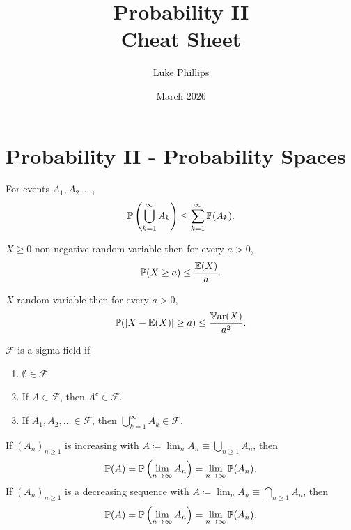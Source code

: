\documentclass[10pt, a4paper]{article}
\title{Probability II \\
    \large Cheat Sheet}
\author{Luke Phillips}
\date{March 2026}
\begin{document}
\maketitle

\newpage

\section{Probability II -
    Probability Spaces}

\begin{proposition}
    For events $A_1, A_2, \dotsc$,
    \[
    \P\left(\bigcup_{k = 1}^{\infty}A_k\right) \leq \sum_{k = 1}^{\infty}\P(A_k).
    \]
\end{proposition}

\begin{proposition}
    $X \geq 0$ non-negative random variable then for every $a > 0$,
    \[
    \P(X \geq a) \leq \frac{\E(X)}{a}.
    \]
\end{proposition}

\begin{proposition}
    $X$ random variable then for every $a > 0$,
    \[
    \P(|X - \E(X)| \geq a) \leq \frac{\Var(X)}{a ^ 2}.
    \]
\end{proposition}

\begin{definition}
    $\mathcal{F}$ is a sigma field if
    \begin{enumerate}[label = (\roman*)]
        \item $\emptyset \in \mathcal{F}$.

        \item If $A \in \mathcal{F}$,
        then $A ^ c \in \mathcal{F}$.

        \item If $A_1, A_2, \dotsc \in \mathcal{F}$,
        then $\bigcup_{k = 1}^{\infty}A_k \in \mathcal{F}$.
    \end{enumerate}
\end{definition}

\begin{lemma}
    If $(A_n)_{n \geq 1}$ is increasing with $A \coloneqq \lim_{n}A_n \equiv \bigcup_{n \geq 1}A_n$,
    then
    \[
    \P(A) = \P\left(\lim_{n \to \infty}A_n\right) = \lim_{n \to \infty}\P(A_n).
    \]
    If $(A_n)_{n \geq 1}$ is a decreasing sequence with $A \coloneqq \lim_{n}A_n \equiv \bigcap_{n \geq 1}A_n$,
    then
    \[
    \P(A) = \P\left(\lim_{n \to \infty}A_n\right) = \lim_{n \to \infty}\P(A_n).
    \]
\end{lemma}
\end{document}
